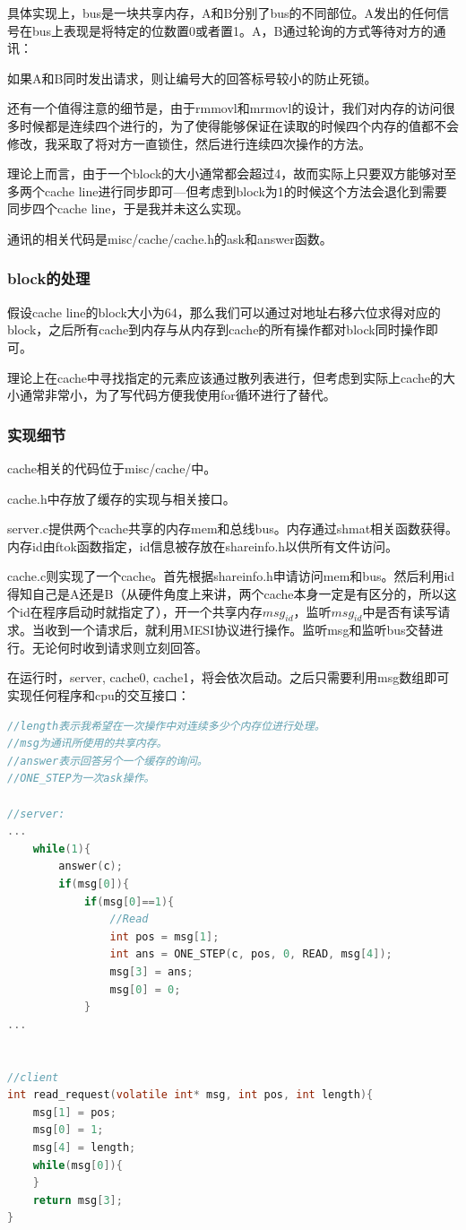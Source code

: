 \documentclass{article}
\theoremstyle{plain} \newtheorem{theorem}{常识}[section]
\theoremstyle{plain} \newtheorem{lizi}{例}[section]
\begin{document}
具体实现上，bus是一块共享内存，A和B分别了bus的不同部位。A发出的任何信号在bus上表现是将特定的位数置0或者置1。A，B通过轮询的方式等待对方的通讯：

如果A和B同时发出请求，则让编号大的回答标号较小的防止死锁。

还有一个值得注意的细节是，由于rmmovl和mrmovl的设计，我们对内存的访问很多时候都是连续四个进行的，为了使得能够保证在读取的时候四个内存的值都不会修改，我采取了将对方一直锁住，然后进行连续四次操作的方法。

理论上而言，由于一个block的大小通常都会超过4，故而实际上只要双方能够对至多两个cache line进行同步即可---但考虑到block为1的时候这个方法会退化到需要同步四个cache line，于是我并未这么实现。

通讯的相关代码是misc/cache/cache.h的ask和answer函数。

\subsubsection{block的处理}
假设cache line的block大小为64，那么我们可以通过对地址右移六位求得对应的block，之后所有cache到内存与从内存到cache的所有操作都对block同时操作即可。

理论上在cache中寻找指定的元素应该通过散列表进行，但考虑到实际上cache的大小通常非常小，为了写代码方便我使用for循环进行了替代。

\subsubsection{实现细节}
cache相关的代码位于misc/cache/中。

cache.h中存放了缓存的实现与相关接口。

server.c提供两个cache共享的内存mem和总线bus。内存通过shmat相关函数获得。内存id由ftok函数指定，id信息被存放在shareinfo.h以供所有文件访问。

cache.c则实现了一个cache。首先根据shareinfo.h申请访问mem和bus。然后利用id得知自己是A还是B（从硬件角度上来讲，两个cache本身一定是有区分的，所以这个id在程序启动时就指定了），开一个共享内存$msg_{id}$，监听$msg_{id}$中是否有读写请求。当收到一个请求后，就利用MESI协议进行操作。监听msg和监听bus交替进行。无论何时收到请求则立刻回答。

在运行时，server, cache0, cache1，将会依次启动。之后只需要利用msg数组即可实现任何程序和cpu的交互接口：

\begin{lstlisting}[language=C]
//length表示我希望在一次操作中对连续多少个内存位进行处理。
//msg为通讯所使用的共享内存。
//answer表示回答另个一个缓存的询问。
//ONE_STEP为一次ask操作。

//server:
...
    while(1){
        answer(c);
        if(msg[0]){
            if(msg[0]==1){
                //Read
                int pos = msg[1];
                int ans = ONE_STEP(c, pos, 0, READ, msg[4]);
                msg[3] = ans;
                msg[0] = 0;
            }
...


//client
int read_request(volatile int* msg, int pos, int length){
    msg[1] = pos;
    msg[0] = 1;
    msg[4] = length;
    while(msg[0]){
    }
    return msg[3];
}

\end{lstlisting}
\end{document}
